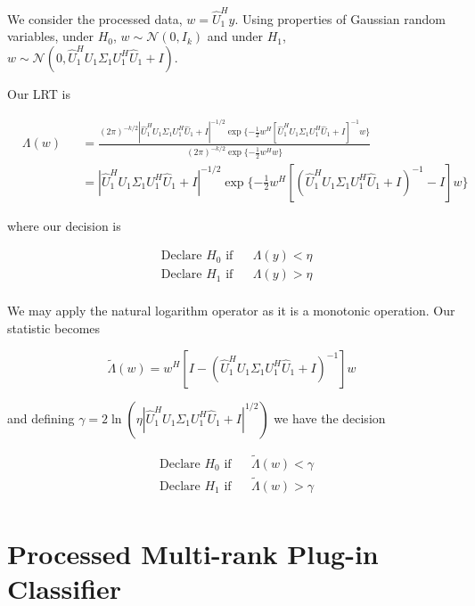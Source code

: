 \documentclass[english]{article}
\begin{document}
We consider the processed data, $w=\hat{U}_1^Hy$. Using properties of Gaussian random variables, under $H_0$, $w\sim\mathcal{N}(0,I_k)$ and under $H_1$, $w\sim\mathcal{N}(0, \hat{U}_1^HU_1\Sigma_1U_1^H\hat{U}_1 +I)$.

Our LRT is

\begin{equation}
\begin{aligned}
&\Lambda(w)
&&=\frac{(2\pi)^{-k/2}|\hat{U}_1^HU_1\Sigma_1U_1^H\hat{U}_1+I|^{-1/2}\exp\{-\frac{1}{2}w^H\left[\hat{U}_1^HU_1\Sigma_1U_1^H\hat{U}_1+I\right]^{-1}w\}}{(2\pi)^{-k/2}\exp\{-\frac{1}{2}w^Hw\}}\\
&&&=|\hat{U}_1^HU_1\Sigma_1U_1^H\hat{U}_1+I|^{-1/2}\exp\{-\frac{1}{2}w^H\left[\left(\hat{U}_1^HU_1\Sigma_1U_1^H\hat{U}_1+I\right)^{-1} - I\right]w\}
\end{aligned}
\end{equation}

where our decision is

\begin{equation}
\begin{aligned}
&\text{Declare } H_0 \text{ if}
&& \Lambda(y) < \eta\\
& \text{Declare } H_1 \text{ if}
&& \Lambda(y) > \eta\\
\end{aligned}
\end{equation}

We may apply the natural logarithm operator as it is a monotonic operation. Our statistic becomes

\begin{equation}\label{eq:proc mr oracle}
\boxed{\tilde{\Lambda}(w) = w^H\left[I-\left(\hat{U}_1^HU_1\Sigma_1U_1^H\hat{U}_1+I\right)^{-1}\right]w}
\end{equation}

and defining $\gamma=2\ln\left(\eta|\hat{U}_1^HU_1\Sigma_1U_1^H\hat{U}_1+I|^{1/2}\right)$ we have the decision

\begin{equation}
\begin{aligned}
&\text{Declare } H_0 \text{ if}
&& \tilde{\Lambda}(w) < \gamma\\
& \text{Declare } H_1 \text{ if}
&& \tilde{\Lambda}(w) > \gamma\\
\end{aligned}
\end{equation}

\section*{Processed Multi-rank Plug-in Classifier}
\end{document}
